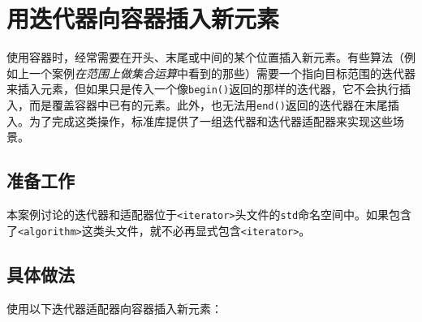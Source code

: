 
\section{用迭代器向容器插入新元素}



使用容器时，经常需要在开头、末尾或中间的某个位置插入新元素。有些算法（例如上一个案例\textit{在范围上做集合运算}中看到的那些）需要一个指向目标范围的迭代器来插入元素，但如果只是传入一个像\texttt{begin()}返回的那样的迭代器，它不会执行插入，而是覆盖容器中已有的元素。此外，也无法用\texttt{end()}返回的迭代器在末尾插入。为了完成这类操作，标准库提供了一组迭代器和迭代器适配器来实现这些场景。



\subsection{准备工作}



本案例讨论的迭代器和适配器位于\texttt{<\allowbreak{}iterator>}头文件的\texttt{std}命名空间中。如果包含了\texttt{<\allowbreak{}algorithm>}这类头文件，就不必再显式包含\texttt{<\allowbreak{}iterator>}。



\subsection{具体做法}



使用以下迭代器适配器向容器插入新元素：



